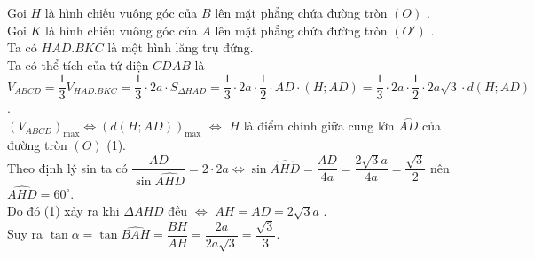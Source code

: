 \begin{ex}
{\begin{center}
		\end{center}
		Gọi $H$ là hình chiếu vuông góc của $B$ lên mặt phẳng chứa đường tròn $(O)$ .\\
		Gọi $K$ là hình chiếu vuông góc của $A$ lên mặt phẳng chứa đường tròn $\left(O'\right)$ .\\
		Ta có $HAD.BKC$ là một hình lăng trụ đứng.\\
		Ta có thể tích của tứ diện $CDAB$ là\\
		$V_{ABCD}=\dfrac{1}{3}{V_{HAD.BKC}}=\dfrac{1}{3}\cdot2a\cdot S_{\Delta HAD}=\dfrac{1}{3}\cdot 2a\cdot \dfrac{1}{2}\cdot AD\cdot \left(H;AD\right)=\dfrac{1}{3}\cdot2a\cdot\dfrac{1}{2}\cdot 2a\sqrt{3}\cdot d\left(H;AD\right)$ .\\
		$\left(V_{ABCD}\right)_{\text{max}}\Leftrightarrow{\left(d\left(H;AD\right)\right)_{\text{max}}}$ $\Leftrightarrow $ $H$ là điểm chính giữa cung lớn $\overset\frown{AD}$ của đường tròn $(O)$ (1).\\
		Theo định lý sin ta có $\dfrac{AD}{\sin\widehat{AHD}}=2\cdot2a\Leftrightarrow\sin\widehat{AHD}=\dfrac{AD}{4a}=\dfrac{2\sqrt{3}a}{4a}=\dfrac{\sqrt{3}}{2}$ nên $\widehat{AHD}=60^\circ$.\\
		Do đó (1) xảy ra khi $\Delta AHD$ đều $\Leftrightarrow $ $AH=AD=2\sqrt{3}a$ .\\
		Suy ra $\tan\alpha=\tan\widehat{BAH}=\dfrac{BH}{AH}=\dfrac{2a}{2a\sqrt{3}}=\dfrac{\sqrt{3}}{3}$.}
\end{ex}


